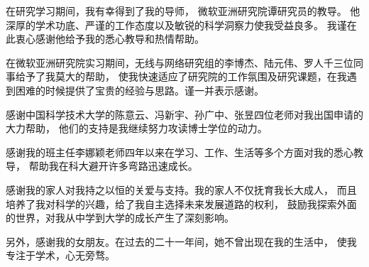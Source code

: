 \begin{acknowledgements}

在研究学习期间，我有幸得到了我的导师，
微软亚洲研究院谭研究员的教导。
他深厚的学术功底、严谨的工作态度以及敏锐的科学洞察力使我受益良多。
我谨在此衷心感谢他给予我的悉心教导和热情帮助。

在微软亚洲研究院实习期间，无线与网络研究组的李博杰、陆元伟、罗人千三位同事给予了我莫大的帮助，
使我快速适应了研究院的工作氛围及研究课题，在我遇到困难的时候提供了宝贵的经验与思路。谨一并表示感谢。

感谢中国科学技术大学的陈意云、冯新宇、孙广中、张昱四位老师对我出国申请的大力帮助，
他们的支持是我继续努力攻读博士学位的动力。

感谢我的班主任李娜颖老师四年以来在学习、工作、生活等多个方面对我的悉心教导，
帮助我在科大避开许多弯路迅速成长。

感谢我的家人对我持之以恒的关爱与支持。我的家人不仅抚育我长大成人，
而且培养了我对科学的兴趣，给了我自主选择未来发展道路的权利，
鼓励我探索外面的世界，对我从中学到大学的成长产生了深刻影响。

另外，感谢我的女朋友。在过去的二十一年间，她不曾出现在我的生活中，
使我专注于学术，心无旁骛。

\bigskip
{}

\end{acknowledgements}
